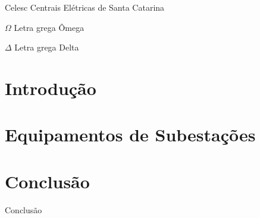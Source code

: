 \documentclass[a5paper]{ufsc-thesis}
\begin{document}

\begin{siglas}
  \item[Celesc] Centrais Elétricas de Santa Catarina
\end{siglas}

\begin{simbolos}
  \item[$ \Omega $] Letra grega Ômega
  \item[$ \Delta $] Letra grega Delta
\end{simbolos}

\tableofcontents*
\cleardoublepage




\chapter*[Introdução]{Introdução} %
\lipsum[1-2]


\chapter{Equipamentos de Subestações}
\label{chap:equipSE}
\lipsum

\chapter*[Conclusão]{Conclusão}
Conclusão



\end{document}
